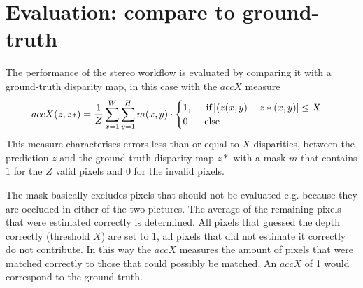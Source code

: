 \documentclass{article}
\begin{document}
\section{Evaluation: compare to ground-truth}
The performance of the stereo workflow is evaluated by comparing it with a ground-truth disparity map, in this case with the $accX$ measure
\begin{equation}
accX(z,z*) = \frac{1}{Z} \sum\limits_{x=1}^W \sum\limits_{y=1}^H m(x,y) \cdot \begin{cases}
1, \hspace{0.5cm} \text{if} \, |(z(x,y) - z*(x,y)| \leq X\\
0\phantom{,} \hspace{0.5cm} \text{else}
\end{cases}
\end{equation}
This measure characterises errors less than or equal to $X$ disparities, between the prediction $z$ and the ground truth disparity map $z*$ with a mask $m$ that contains $1$ for the $Z$ valid pixels and $0$ for the invalid pixels.

The mask basically excludes pixels that should not be evaluated e.g. because they are occluded in either of the two pictures. The average of the remaining pixels that were estimated correctly is determined. All pixels that guessed the depth correctly (threshold $X$) are set to $1$, all pixels that did not estimate it correctly do not contribute. In this way the $accX$ measures the amount of pixels that were matched correctly to those that could possibly be matched. An $accX$ of 1 would correspond to the ground truth.
\end{document}
